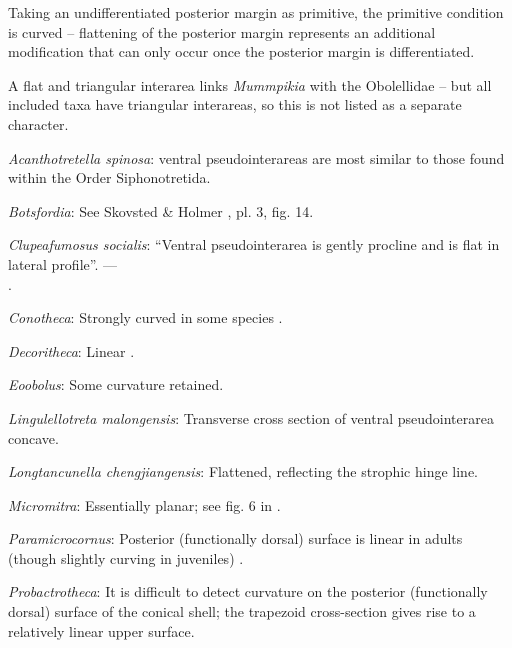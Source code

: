 \documentclass[openany]{book}
\theoremstyle{definition}
\theoremstyle{definition}
\theoremstyle{definition}
\theoremstyle{remark}
\begin{document}
Taking an undifferentiated posterior margin as primitive, the primitive
condition is curved -- flattening of the posterior margin represents an
additional modification that can only occur once the posterior margin is
differentiated.

A flat and triangular interarea links \emph{Mummpikia} with the
Obolellidae \citep{Balthasar2008iMummpikia} -- but all included taxa
have triangular interareas, so this is not listed as a separate
character.

\hypertarget{Acanthotretella_spinosa-coding-103}{}
\emph{Acanthotretella spinosa}: ventral pseudointerareas are most
similar to those found within the Order Siphonotretida.

\hypertarget{Botsfordia-coding-103}{}
\emph{Botsfordia}: See Skovsted \& Holmer
\citeyearpar{Skovsted2005EarlyCambrian}, pl. 3, fig. 14.

\hypertarget{Clupeafumosus_socialis-coding-103}{}
\emph{Clupeafumosus socialis}: ``Ventral pseudointerarea is gently
procline and is flat in lateral profile''. ---\\
\citep{Topper2013Reappraisalof}.

\hypertarget{Conotheca-coding-103}{}
\emph{Conotheca}: Strongly curved in some species \citep{Wrona2003}.

\hypertarget{Decoritheca-coding-103}{}
\emph{Decoritheca}: Linear \citep{Malinky1987}.

\hypertarget{Eoobolus-coding-103}{}
\emph{Eoobolus}: Some curvature retained.

\hypertarget{Lingulellotreta_malongensis-coding-103}{}
\emph{Lingulellotreta malongensis}: Transverse cross section of ventral
pseudointerarea concave.

\hypertarget{Longtancunella_chengjiangensis-coding-103}{}
\emph{Longtancunella chengjiangensis}: Flattened, reflecting the
strophic hinge line.

\hypertarget{Micromitra-coding-103}{}
\emph{Micromitra}: Essentially planar; see fig. 6 in
\citet{Ushatinskaya2016Protegulumand}.

\hypertarget{Paramicrocornus-coding-103}{}
\emph{Paramicrocornus}: Posterior (functionally dorsal) surface is
linear in adults (though slightly curving in juveniles)
\citep{Zhang2018Ahyolithid}.

\hypertarget{Probactrotheca-coding-103}{}
\emph{Probactrotheca}: It is difficult to detect curvature on the
posterior (functionally dorsal) surface of the conical shell; the
trapezoid cross-section gives rise to a relatively linear upper surface.
\end{document}
